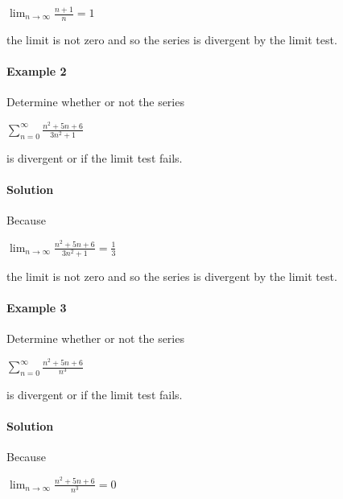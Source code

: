 $\lim _{n \rightarrow \infty}{\frac{n+1}{n}}=1$



the limit is not zero and so the series is divergent by the limit test.



\paragraph{Example 2}



Determine whether or not the series



$\sum _{n=0}^{\infty}{\frac{n^2+5n+6}{3n^2+1}}$



is divergent or if the limit test fails.



\paragraph{Solution}



Because



$\lim _{n \rightarrow \infty}{\frac{n^2+5n+6}{3n^2+1}}= \frac{1}{3}$



the limit is not zero and so the series is divergent by the limit test.



\paragraph{Example 3}



Determine whether or not the series



$\sum _{n=0}^{\infty}{\frac{n^2+5n+6}{n^3}}$



is divergent or if the limit test fails.



\paragraph{Solution}



Because



$\lim _{n \rightarrow \infty}{\frac{n^2+5n+6}{n^3}}= 0$



